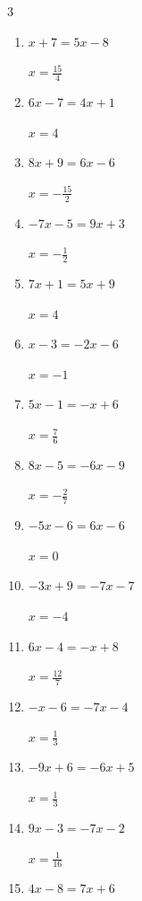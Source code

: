 \begin{multicols}{3}
\begin{enumerate}
  \item $x+7=5x-8$

        $\displaystyle x=\frac{15}{4}$

  \item $6x-7=4x+1$

        $\displaystyle x=4$

  \item $8x+9=6x-6$

        $\displaystyle x=-\frac{15}{2}$

\columnbreak %

  \item $-7x-5=9x+3$

        $\displaystyle x=-\frac{1}{2}$

  \item $7x+1=5x+9$

        $\displaystyle x=4$

  \item $x-3=-2x-6$

        $\displaystyle x=-1$

  \item $5x-1=-x+6$

        $\displaystyle x=\frac{7}{6}$

  \item $8x-5=-6x-9$

        $\displaystyle x=-\frac{2}{7}$

  \item $-5x-6=6x-6$

        $\displaystyle x=0$

  \item $-3x+9=-7x-7$

        $\displaystyle x=-4$

  \item $6x-4=-x+8$

        $\displaystyle x=\frac{12}{7}$

  \item $-x-6=-7x-4$

        $\displaystyle x=\frac{1}{3}$

  \item $-9x+6=-6x+5$

        $\displaystyle x=\frac{1}{3}$

  \item $9x-3=-7x-2$

        $\displaystyle x=\frac{1}{16}$

  \item $4x-8=7x+6$


\end{enumerate}
\end{multicols}
